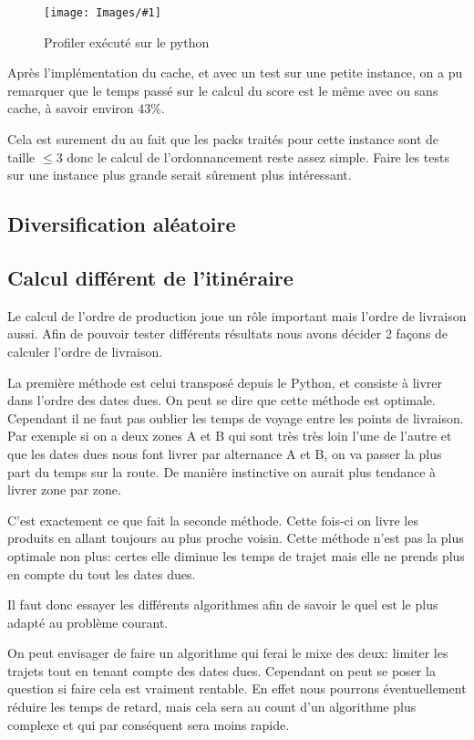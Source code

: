 \documentclass[hideweeklyreports]{polytech/polytech}
\newcommand{\img}[3]{%
	\begin{figure}[H]
		\centering
   		\texttt{[image: Images/\#1]}
  	 	\caption{#2}
	\end{figure}
}
\begin{document}
				\img{PythonProfilerTop.png}{Profiler exécuté sur le python}{0.3}
				
				Après l'implémentation du cache, et avec un test sur une petite instance, on a pu remarquer que le temps passé sur le calcul du score est le même avec ou sans cache, à savoir environ $43\%$.
				
				Cela est surement du au fait que les packs traités pour cette instance sont de taille $\leq 3$ donc le calcul de l'ordonnancement reste assez simple. Faire les tests sur une instance plus grande serait sûrement plus intéressant. %
			
			\subsection{Diversification aléatoire} %
			\subsection{Calcul différent de l'itinéraire}
				Le calcul de l'ordre de production joue un rôle important mais l'ordre de livraison aussi. Afin de pouvoir tester différents résultats nous avons décider 2 façons de calculer l'ordre de livraison.
				
				La première méthode est celui transposé depuis le Python, et consiste à livrer dans l'ordre des dates dues. On peut se dire que cette méthode est optimale. Cependant il ne faut pas oublier les temps de voyage entre les points de livraison. Par exemple si on a deux zones A et B qui sont très très loin l'une de l'autre et que les dates dues nous font livrer par alternance A et B, on va passer la plus part du temps sur la route. De manière instinctive on aurait plus tendance à livrer zone par zone.
				
				C'est exactement ce que fait la seconde méthode. Cette fois-ci on livre les produits en allant toujours au plus proche voisin. Cette méthode n'est pas la plus optimale non plus: certes elle diminue les temps de trajet mais elle ne prends plus en compte du tout les dates dues.
				
				Il faut donc essayer les différents algorithmes afin de savoir le quel est le plus adapté au problème courant.
				
				On peut envisager de faire un algorithme qui ferai le mixe des deux: limiter les trajets tout en tenant compte des dates dues. Cependant on peut se poser la question si faire cela est vraiment rentable. En effet nous pourrons éventuellement réduire les temps de retard, mais cela sera au count d'un algorithme plus complexe et qui par conséquent sera moins rapide. 
				
\end{document}
